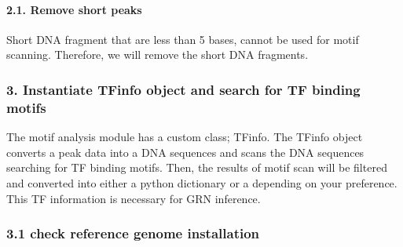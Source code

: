 \documentclass[letterpaper,10pt,english]{sphinxmanual}
\begin{document}
\paragraph{2.1. Remove short peaks}
\label{\detokenize{notebooks/02_motif_scan/02_atac_peaks_to_TFinfo_with_celloracle_190901:2.1.-Remove-short-peaks}}
Short DNA fragment that are less than 5 bases, cannot be used for motif scanning. Therefore, we will remove the short DNA fragments.

{
\begin{sphinxVerbatim}[commandchars=\\\{\}]
\llap{\color{nbsphinxin}[6]:\,\hspace{\fboxrule}\hspace{\fboxsep}}  \PYG{p}{[}\PYG{p}{]}
\end{sphinxVerbatim}
}


\subsubsection{3. Instantiate TFinfo object and search for TF binding motifs}
\label{\detokenize{notebooks/02_motif_scan/02_atac_peaks_to_TFinfo_with_celloracle_190901:3.-Instantiate-TFinfo-object-and-search-for-TF-binding-motifs}}
The motif analysis module has a custom class; TFinfo. The TFinfo object converts a peak data into a DNA sequences and scans the DNA sequences searching for TF binding motifs. Then, the results of motif scan will be filtered and converted into either a python dictionary or a depending on your preference. This TF information is necessary for GRN inference.


\subsubsection{3.1 check reference genome installation}
\label{\detokenize{notebooks/02_motif_scan/02_atac_peaks_to_TFinfo_with_celloracle_190901:3.1-check-reference-genome-installation}}
{
\begin{sphinxVerbatim}[commandchars=\\\{\}]
\llap{\color{nbsphinxin}[7]:\,\hspace{\fboxrule}\hspace{\fboxsep}}
  

\end{sphinxVerbatim}
}
\end{document}
